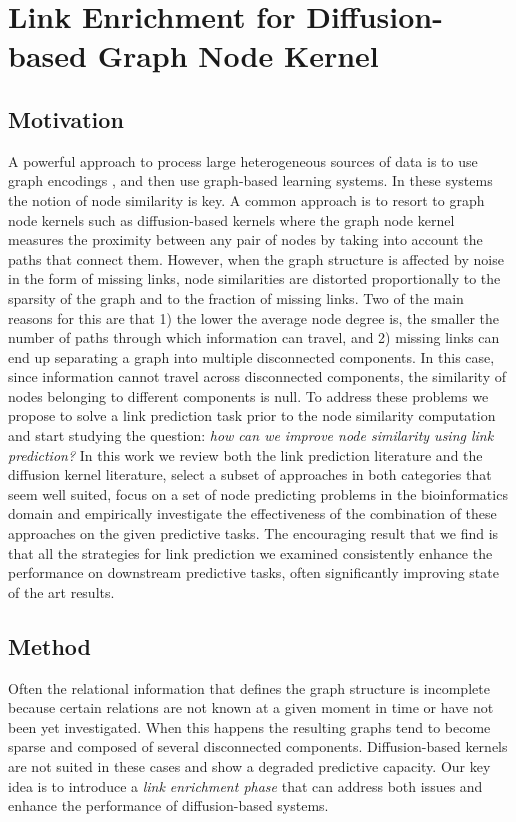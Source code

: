 \chapter{Link Enrichment for Diffusion-based Graph Node Kernel}
\label{chap:link-enrichment}
\section{Motivation}
A powerful approach to process large heterogeneous sources of data is to use graph encodings \cite{proceeding1}, \cite{jour1} and then use graph-based learning systems. In these systems the notion of node similarity is key. A common approach is to resort to graph node kernels such as diffusion-based kernels \cite{proceeding2} where the graph node kernel measures the proximity between any pair of nodes by taking into account the paths that connect them. However, when the graph structure is affected by noise in the form of missing links, node similarities are distorted  proportionally to the sparsity of the graph and to the fraction of missing links. Two of the main reasons for this are that 1) the lower the average node degree is, the smaller the number of paths through which information can travel, and 2) missing links can end up separating a graph into multiple disconnected components. In this case, since  information cannot travel across disconnected components, the similarity of nodes belonging to different components is null. To address these problems we propose to solve a link prediction task prior to the node similarity computation and start studying the question: {\em how can we
improve node similarity using link prediction?} In this work we review both the link prediction literature and the diffusion kernel literature, select a subset of approaches in both categories that seem well suited, focus on a set of node predicting problems in the bioinformatics domain and empirically investigate the effectiveness of the combination of these approaches on the given predictive tasks. The encouraging result that we find is that all the strategies for link prediction we examined consistently enhance the performance on downstream predictive tasks, often significantly improving state of the art results.
\section{Method}
Often the relational information that defines the graph structure is incomplete because certain relations are not known at a given moment in time or have not been yet investigated. When this happens the resulting graphs tend to become sparse and composed of several disconnected components. Diffusion-based kernels are not suited in these cases and show a degraded predictive capacity. Our key idea is to introduce a {\em link enrichment phase} that can address both issues and enhance the performance of diffusion-based systems.

